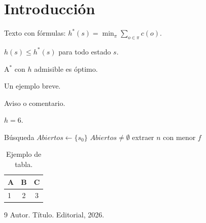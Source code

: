 \documentclass[memoria]{uc3mmaster}
\begin{document}
\makeportada

\section{Introducción}
Texto con fórmulas: $h^{*}(s)=\min_{\pi}\sum_{o\in\pi}c(o)$.

\begin{definicion}
$h(s)\le h^{*}(s)$ para todo estado $s$.
\end{definicion}
\begin{teorema}[A$^*$]  A$^*$ con $h$ admisible es óptimo. \end{teorema}
\begin{ejemplo} Un ejemplo breve. \end{ejemplo}
\begin{nota} Aviso o comentario. \end{nota}
\begin{resultado}[Resultado]  $h=6$. \end{resultado}

\begin{pseudocodigo}{Búsqueda}
\pl $\mathit{Abiertos}\gets\{s_0\}$
\pl {} $\mathit{Abiertos}\neq\emptyset$ 
\pl \ind extraer $n$ con menor $f$
\end{pseudocodigo}

\begin{table}[h]\centering
\begin{tabular}{@{}lcc@{}}\toprule A & B & C\\\midrule 1 & 2 & 3\\\bottomrule\end{tabular}
\caption{Ejemplo de tabla.}
\end{table}

\begin{thebibliography}{9}\footnotesize
{} Autor. Título. Editorial, 2026.
\end{thebibliography}

\makecontraportada   %
\end{document}
